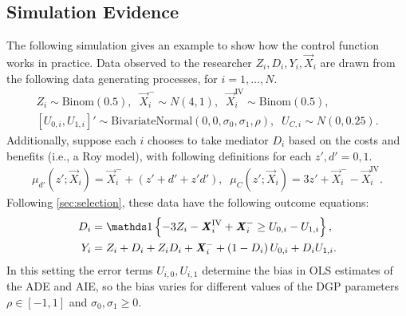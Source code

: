 \subsection{Simulation Evidence}
The following simulation gives an example to show how the control function works in practice.
Data observed to the researcher $Z_i, D_i, Y_i, \vec X_i$ are drawn from the following data generating processes, for $i = 1, \hdots, N$.
\begin{align*}
    Z_i \sim \text{Binom}\left(0.5 \right),
    \;\; \vec X_i^- \sim N(4, 1),
    \;\; \vec X_i^{\text{IV}} \sim \text{Binom}\left( 0.5 \right), \\
    \left[ U_{0,i}, U_{1,i} \right]' \sim
    \text{BivariateNormal}\left( 0, 0, \sigma_0, \sigma_1, \rho \right),
    \;\; U_{C,i} \sim N(0, 0.25).
\end{align*}
Additionally, suppose each $i$ chooses to take mediator $D_i$ based on the costs and benefits (i.e., a Roy model), with following definitions for each $z', d' = 0, 1$.
\begin{align*}
    \mu_{d'}\left(z' ; \vec X_i \right) = \vec X_i^- + \left( z' + d' + z' d' \right),
    \;\; \mu_{C}\left(z' ; \vec X_i \right) = 3z' + \vec X_i^- - \vec X_i^{\text{IV}}.
\end{align*}
Following \autoref{sec:selection}, these data have the following outcome equations:
\begin{align*}
    D_i &= \indicator{-3Z_i - \vec X_i^{\text{IV}} + \vec X_i^- \geq U_{0,i} - U_{1,i}},  \\
    Y_i &= Z_i + D_i + Z_i D_i + \vec X_i^-
        + \left( 1 - D_i \right) U_{0,i} + D_i U_{1,i}.
\end{align*}
In this setting the error terms $U_{i, 0}, U_{i, 1}$ determine the bias in OLS estimates of the ADE and AIE, so the bias varies for different values of the DGP parameters $\rho \in [-1, 1]$ and $\sigma_0, \sigma_1 \geq 0$.


